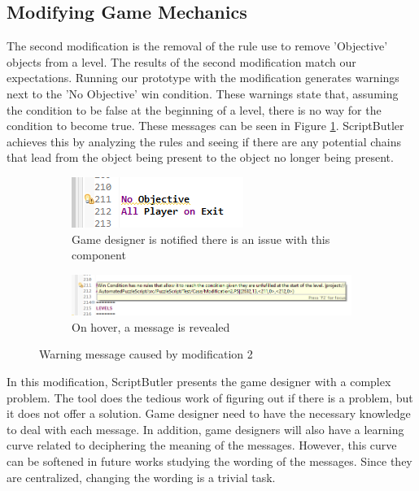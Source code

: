 \subsection{Modifying Game Mechanics}
The second modification is the removal of the rule use to remove 'Objective' objects from a level. The results of the second modification match our expectations. Running our prototype with the modification generates warnings next to the 'No Objective' win condition. These warnings state that, assuming the condition to be false at the beginning of a level, there is no way for the condition to become true. These messages can be seen in Figure \ref{fig:modification_2_results}. ScriptButler achieves this by analyzing the rules and seeing if there are any potential chains that lead from the object being present to the object no longer being present.

\begin{figure}[!t]
    \begin{subfigure}{1\textwidth}
        \centering
        \includegraphics[scale=1.25]{images/case_results/Modification_2_Results_IDE.png}
        \caption{Game designer is notified there is an issue with this component}
    \end{subfigure}
    \begin{subfigure}{1\textwidth}
        \centering
        \includegraphics[scale=0.9]{images/case_results/Modification_2_Results.png}
        \caption{On hover, a message is revealed}
    \end{subfigure}

    \caption{Warning message caused by modification 2}
    \label{fig:modification_2_results}
\end{figure}

In this modification, ScriptButler presents the game designer with a complex problem. The tool does the tedious work of figuring out if there is a problem, but it does not offer a solution. Game designer need to have the necessary knowledge to deal with each message. In addition, game designers will also have a learning curve related to deciphering the meaning of the messages. However, this curve can be softened in future works studying the wording of the messages. Since they are centralized, changing the wording is a trivial task. 

